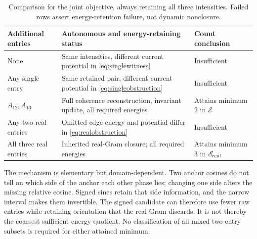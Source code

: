 \begin{table}[htbp]
\centering\small
\caption{Comparison for the joint objective, always retaining all three intensities. Failed rows assert energy-retention failure, not dynamic nonclosure.}\label{tab:comparison}
\begin{tabularx}{\textwidth}{@{}>{\raggedright\arraybackslash}p{}YY@{}}
\toprule
Additional entries & Autonomous and energy-retaining status & Count conclusion\\\midrule
None & Same intensities, different current potential in \eqref{eq:singlewitness} & Insufficient\\
Any single entry & Same retained pair, different current potential in \eqref{eq:singleobstruction} & Insufficient\\
\(A_{12},A_{13}\) & Full coherence reconstruction, invariant update, all required energies & Attains minimum \(2\) in \(\mathscr E\)\\
Any two real entries & Omitted edge energy and potential differ in \eqref{eq:realobstruction} & Insufficient\\
All three real entries & Inherited real-Gram closure; all required energies & Attains minimum \(3\) in \(\mathscr E_{\rm real}\)\\
\bottomrule
\end{tabularx}
\end{table}

The mechanism is elementary but domain-dependent. Two anchor cosines do not tell on which side of the anchor each other phase lies; changing one side alters the missing relative cosine. Signed sines retain that side information, and the narrow interval makes them invertible. The signed candidate can therefore use fewer raw entries while retaining orientation that the real Gram discards. It is not thereby the coarsest sufficient energy quotient. No classification of all mixed two-entry subsets is required for either attained minimum.
